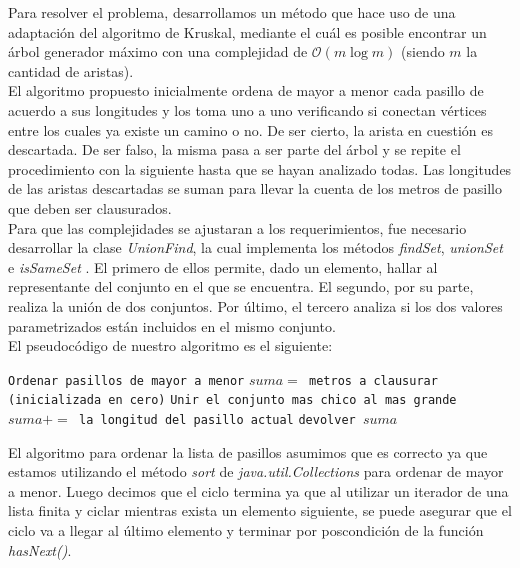Para resolver el problema, desarrollamos un método que hace uso de una adaptación del algoritmo de Kruskal, mediante el cuál es posible encontrar un árbol generador máximo con una complejidad de $\mathcal{O}(m\log{}m)$ (siendo $m$ la cantidad de aristas).\\
El algoritmo propuesto inicialmente ordena de mayor a menor cada pasillo de acuerdo a sus longitudes y los toma uno a uno verificando si conectan vértices entre los cuales ya existe un camino o no. De ser cierto, la arista en cuestión es descartada. De ser falso, la misma pasa a ser parte del árbol y se repite el procedimiento con la siguiente hasta que se hayan analizado todas. Las longitudes de las aristas descartadas se suman para llevar la cuenta de los metros de pasillo que deben ser clausurados.\\
Para que las complejidades se ajustaran a los requerimientos, fue necesario desarrollar la clase \textit{UnionFind}, la cual implementa los métodos \textit{findSet}, \textit{unionSet} e \textit{isSameSet} . El primero de ellos permite, dado un elemento, hallar al representante del conjunto en el que se encuentra. El segundo, por su parte, realiza la unión de dos conjuntos. Por último, el tercero analiza si los dos valores parametrizados están incluidos en el mismo conjunto. \\

El pseudocódigo de nuestro algoritmo es el siguiente:

\begin{algorithmic} 

\STATE \texttt{Ordenar pasillos de mayor a menor}
\STATE \texttt{$suma = $ metros a clausurar (inicializada en cero)}
		\STATE \texttt{Unir el conjunto mas chico al mas grande}
	\ELSE
		\STATE \texttt{$suma += $ la longitud del pasillo actual}
	\ENDIF
\ENDFOR
\STATE \texttt{devolver $suma$}
\end{algorithmic} 


El algoritmo para ordenar la lista de pasillos asumimos que es correcto ya que estamos utilizando el método \textit{sort} de \emph{java.util.Collections} para ordenar de mayor a menor. Luego decimos que el ciclo termina ya que al utilizar un iterador de una lista finita y ciclar mientras exista un elemento siguiente, se puede asegurar que el ciclo va a llegar al último elemento y terminar por poscondición de la función \textit{hasNext()}.\\

